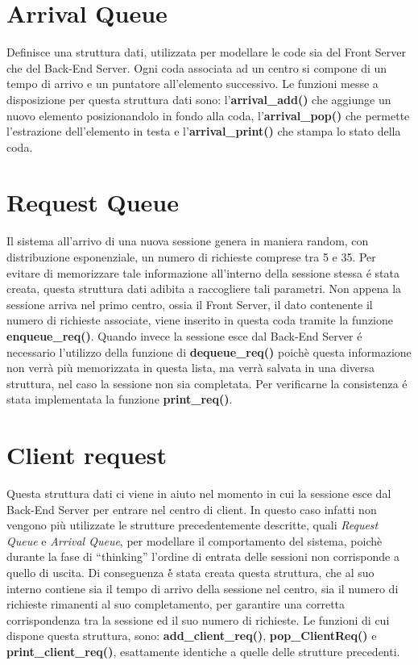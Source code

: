 \section{Arrival Queue}
Definisce una struttura dati, utilizzata per modellare le code sia del Front Server
che del Back-End Server. Ogni coda associata ad un centro si compone di un tempo di arrivo e un puntatore all'elemento successivo. 
Le funzioni messe a disposizione per questa struttura dati sono: 
l'\textbf{arrival\_add()} che aggiunge un nuovo elemento posizionandolo in fondo alla coda, l'\textbf{arrival\_pop()} 
che permette l'estrazione dell'elemento in testa e l'\textbf{arrival\_print()} che stampa lo stato della coda.

\section{Request Queue}
Il sistema all'arrivo di una nuova sessione genera in maniera random,
con distribuzione esponenziale, un numero di richieste comprese tra 5 e 35.
Per evitare di memorizzare tale informazione all'interno della sessione stessa
\'e stata creata, questa struttura dati adibita a raccogliere tali parametri.
Non appena la sessione arriva nel primo centro, ossia il Front Server, il dato 
contenente il numero di richieste associate, viene inserito in questa coda tramite la funzione 
\textbf{enqueue\_req()}. Quando invece la sessione esce dal Back-End Server \'e necessario
l'utilizzo della funzione di \textbf{dequeue\_req()} poich\`e questa informazione non verrà pi\`u
memorizzata in questa lista, ma verr\`a salvata in una diversa struttura, nel caso la sessione non sia completata.
Per verificarne la consistenza \'e stata implementata la funzione \textbf{print\_req()}.

\section{Client request}
Questa struttura dati ci viene in aiuto nel momento in cui la sessione 
esce dal Back-End Server per entrare nel centro di client. In questo caso 
infatti non vengono pi\`u utilizzate le strutture precedentemente descritte,
quali \textit{Request Queue} e \textit{Arrival Queue}, per modellare il comportamento 
del sistema, poich\`e durante la fase di ``thinking'' l'ordine di entrata delle sessioni 
non corrisponde a quello di uscita. Di conseguenza \'è stata creata questa struttura,
che al suo interno contiene sia il tempo di arrivo della sessione nel centro, sia il numero
di richieste rimanenti al suo completamento, per garantire una corretta corrispondenza tra la sessione ed il suo numero di richieste.
Le funzioni di cui dispone questa struttura, sono: 
\textbf{add\_client\_req()}, \textbf{pop\_ClientReq()} e 
\textbf{print\_client\_req()}, esattamente identiche a quelle delle strutture 
precedenti.

